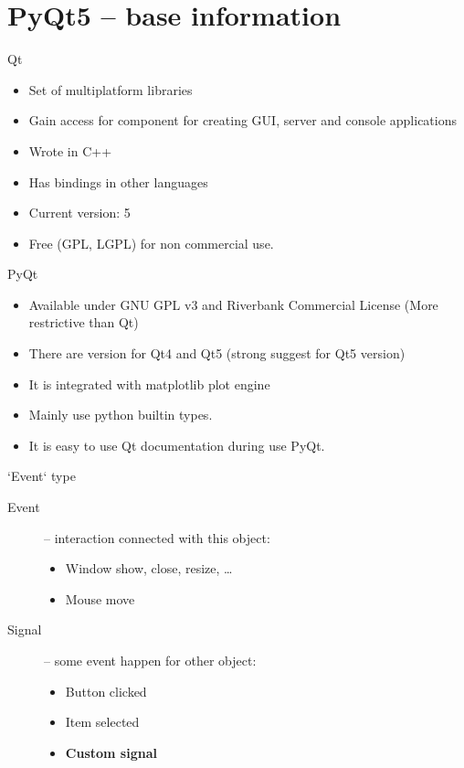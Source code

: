\documentclass[11pt,usenames,dvipsnames]{beamer}
\begin{document}
\section{PyQt5 – base information}
\begin{frame}{Qt}
  \begin{itemize}
    \item Set of multiplatform libraries
    \item Gain access for component for creating GUI, server and console applications
    \item Wrote in C++
    \item Has bindings in other languages 
    \item Current version: 5
    \item Free (GPL, LGPL) for non commercial use. 
  \end{itemize} 
\end{frame}
\begin{frame}[c]{PyQt}
  \begin{itemize}
    \item Available under GNU GPL v3 and Riverbank Commercial License (More restrictive than Qt)
    \item There are version for Qt4 and Qt5 (strong suggest for Qt5 version)
    \item It is integrated with matplotlib plot engine
    \item Mainly use python builtin types.
    \item It is easy to use Qt documentation during use PyQt. 
  \end{itemize}
\end{frame}
\begin{frame}{`Event` type}
  \begin{description}
    \item[Event] – interaction connected with this object:
      \begin{itemize}
        \item Window show, close, resize, \dots
        \item Mouse move
      \end{itemize}
    \item[Signal] – some event happen for other object:
      \begin{itemize}
        \item Button clicked 
        \item Item selected 
        \item \textbf{Custom signal}
      \end{itemize}
  \end{description}
  
\end{frame}
\end{document}
